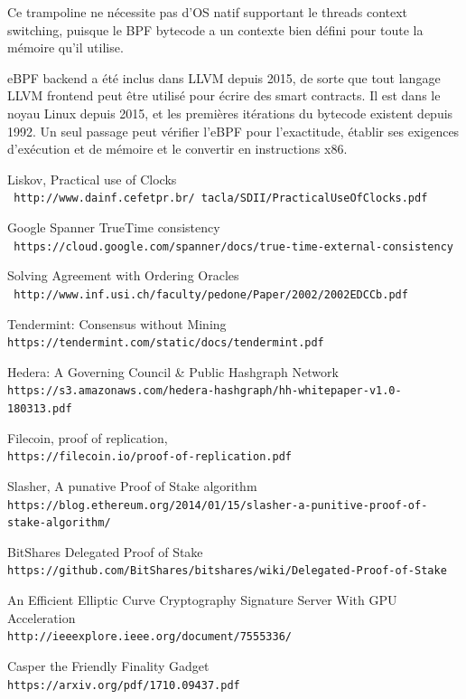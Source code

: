 \documentclass[12pt]{article}
\begin{document}
Ce trampoline ne nécessite pas d’OS natif supportant le threads context switching, puisque le BPF bytecode a un contexte bien défini pour toute la mémoire qu'il utilise.

eBPF backend a été inclus dans LLVM depuis 2015, de sorte que tout langage LLVM frontend peut être utilisé pour écrire des smart contracts. Il est dans le noyau Linux depuis 2015, et les premières itérations du bytecode existent depuis 1992. Un seul passage peut vérifier l'eBPF pour l'exactitude, établir ses exigences d'exécution et de mémoire et le convertir en instructions x86.




\begin{thebibliography}{9}
Liskov, Practical use of Clocks
\\\texttt{ http://www.dainf.cefetpr.br/~tacla/SDII/PracticalUseOfClocks.pdf}

Google Spanner TrueTime consistency
\\\texttt{ https://cloud.google.com/spanner/docs/true-time-external-consistency}

Solving Agreement with Ordering Oracles
\\\texttt{ http://www.inf.usi.ch/faculty/pedone/Paper/2002/2002EDCCb.pdf}

Tendermint: Consensus without Mining
\\\texttt{https://tendermint.com/static/docs/tendermint.pdf}

Hedera: A Governing Council \& Public Hashgraph Network
\\\texttt{https://s3.amazonaws.com/hedera-hashgraph/hh-whitepaper-v1.0-180313.pdf}

Filecoin, proof of replication,
\\\texttt{https://filecoin.io/proof-of-replication.pdf}

Slasher, A punative Proof of Stake algorithm
\\\texttt{https://blog.ethereum.org/2014/01/15/slasher-a-punitive-proof-of-stake-algorithm/}

BitShares Delegated Proof of Stake
\\\texttt{https://github.com/BitShares/bitshares/wiki/Delegated-Proof-of-Stake}

An Efficient Elliptic Curve Cryptography Signature Server With GPU Acceleration
\\\texttt{http://ieeexplore.ieee.org/document/7555336/}

Casper the Friendly Finality Gadget
\\\texttt{https://arxiv.org/pdf/1710.09437.pdf}
\end{thebibliography}
\end{document}
